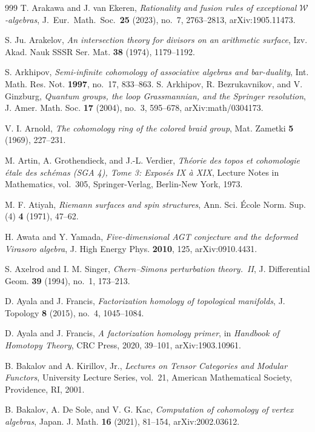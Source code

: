 \begin{thebibliography}{999}
T. Arakawa and J. van Ekeren, \emph{Rationality and fusion rules of exceptional $\mathcal{W}$-algebras}, J.~Eur.\ Math.\ Soc.\ \textbf{25} (2023), no.~7, 2763--2813, arXiv:1905.11473.

S. Ju. Arakelov, \emph{An intersection theory for divisors on an arithmetic surface}, Izv. Akad. Nauk SSSR Ser. Mat. \textbf{38} (1974), 1179--1192.

S. Arkhipov, \emph{Semi-infinite cohomology of associative algebras and bar-duality}, Int. Math. Res. Not. \textbf{1997}, no.~17, 833--863.
S. Arkhipov, R. Bezrukavnikov, and V. Ginzburg, \emph{Quantum groups, the loop Grassmannian, and the Springer resolution}, J. Amer. Math. Soc. \textbf{17} (2004), no.~3, 595--678, arXiv:math/0304173.


V. I. Arnold, \emph{The cohomology ring of the colored braid group}, Mat. Zametki \textbf{5} (1969), 227--231.

M. Artin, A. Grothendieck, and J.-L. Verdier, \emph{Th\'eorie des topos et cohomologie \'etale des sch\'emas (SGA 4), Tome 3: Expos\'es IX \`a XIX}, Lecture Notes in Mathematics, vol.~305, Springer-Verlag, Berlin-New York, 1973.

M. F. Atiyah, \emph{Riemann surfaces and spin structures}, Ann. Sci. \'Ecole Norm. Sup. (4) \textbf{4} (1971), 47--62.

H. Awata and Y. Yamada, \emph{Five-dimensional AGT conjecture and the deformed Virasoro algebra}, J. High Energy Phys. \textbf{2010}, 125, arXiv:0910.4431.

S. Axelrod and I. M. Singer, \emph{Chern--Simons perturbation theory.~II}, J. Differential Geom. \textbf{39} (1994), no.~1, 173--213.

D. Ayala and J. Francis, \emph{Factorization homology of topological manifolds}, J. Topology \textbf{8} (2015), no.~4, 1045--1084.

D. Ayala and J. Francis, \emph{A factorization homology primer}, in \emph{Handbook of Homotopy Theory}, CRC Press, 2020, 39--101, arXiv:1903.10961.

B. Bakalov and A. Kirillov, Jr., \emph{Lectures on Tensor Categories and Modular Functors}, University Lecture Series, vol.~21, American Mathematical Society, Providence, RI, 2001.

B. Bakalov, A. De Sole, and V. G. Kac,
\emph{Computation of cohomology of vertex algebras},
Japan. J. Math. \textbf{16} (2021), 81--154,
arXiv:2002.03612.


\end{thebibliography}
